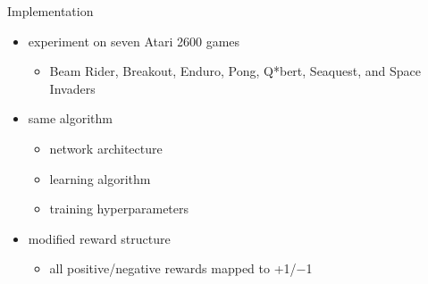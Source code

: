 \begin{frame}{Implementation}
    \begin{itemize}\itemsep=12pt
        
        \item experiment on seven Atari 2600 games
        \vspace*{0.5em}
        \begin{itemize}
            \item Beam Rider, Breakout, Enduro, Pong, Q*bert, Seaquest, and Space Invaders
        \end{itemize}

        \item same algorithm
        \vspace*{0.5em}
        \begin{itemize}
            \item network architecture
            \item learning algorithm
            \item training hyperparameters
        \end{itemize}

        \item modified reward structure
        \vspace*{0.5em}
        \begin{itemize}
            \item all positive/negative rewards mapped to +1/$-$1
        \end{itemize}

    \end{itemize}
\end{frame}

